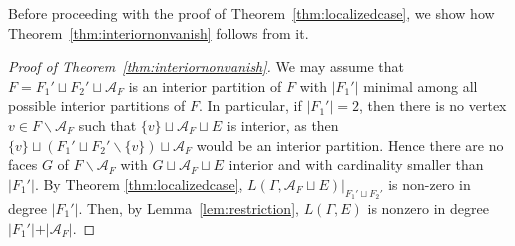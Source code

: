 Before proceeding with the proof of Theorem~\ref{thm:localizedcase}, we show how Theorem~\ref{thm:interiornonvanish} follows from it. 

\begin{proof}[Proof of Theorem~\ref{thm:interiornonvanish}]
We may assume that $F = F_1' \sqcup F_2' \sqcup \mathcal{A}_F$ is an interior partition of $F$ with $\vert F_1' \vert$ minimal among all possible interior partitions of $F$. In particular, if $\vert F_1' \vert = 2$, then there is no vertex $v \in F  \smallsetminus \mathcal{A}_F$ such that $\{v\} \sqcup \mathcal{A}_F \sqcup E$ is interior, as then $\{v\} \sqcup (F_1' \sqcup F_2' \smallsetminus \{v\}) \sqcup \mathcal{A}_F$ would be an interior partition. Hence there are no faces $G$ of $F \smallsetminus \mathcal{A}_F$ with $G \sqcup \mathcal{A}_F \sqcup E$ interior and with cardinality smaller than $\vert F_1' \vert$. 
By Theorem \ref{thm:localizedcase}, $L(\Gamma, \mathcal{A}_F \sqcup E)|_{F_1' \sqcup F_2'}$ is non-zero in degree $\vert F_1' \vert$. Then, by Lemma~\ref{lem:restriction},  $L(\Gamma, E)$ is nonzero in degree $\vert F_1' \vert + \vert \mathcal{A}_F \vert$.
\end{proof}
